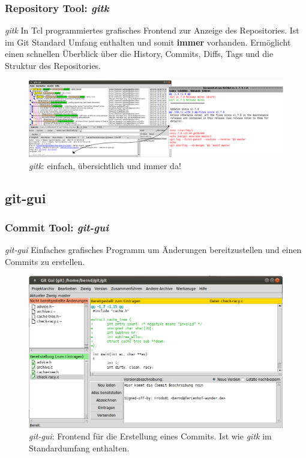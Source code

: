 \documentclass{beamer}
\begin{document}
\begin{frame}\frametitle{Repository Tool: \textit{gitk}}
\begin{block}{\textit{gitk}}
In Tcl programmiertes grafisches Frontend zur Anzeige des Repositories. Ist im Git Standard Umfang enthalten und somit \textbf{immer} vorhanden. Ermöglicht einen schnellen Überblick über die History, Commits, Diffs, Tags und die Struktur des Repositories. 
\end{block}

\begin{figure}
\includegraphics[scale=0.7]{Bilder/gitk} 
\caption{\textit{gitk}: einfach, übersichtlich und immer da!}
\end{figure}
\end{frame}

\subsection{git-gui}
\begin{frame}\frametitle{Commit Tool: \textit{git-gui}}
\begin{block}{\textit{git-gui}}
Einfaches grafisches Programm um Änderungen bereitzustellen und einen Commits zu erstellen. 
\end{block}

\begin{figure}
\includegraphics[scale=1.1]{Bilder/git_gui} 
\caption{\textit{git-gui}: Frontend für die Erstellung eines Commits. Ist wie \textit{gitk} im Standardumfang enthalten.}
\end{figure}
\end{frame}
\end{document}
